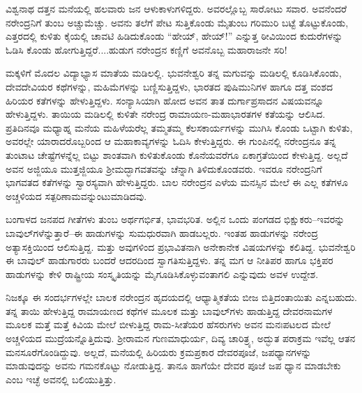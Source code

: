 ವಿಶ್ವನಾಥ ದತ್ತನ ಮನೆಯಲ್ಲಿ ಹಲವಾರು ಜನ ಆಳುಕಾಳುಗಳಿದ್ದರು. ಅವರಲ್ಲೊಬ್ಬ ಸಾರೋಟು ಸವಾರ. ಅವನೆಂದರೆ ನರೇಂದ್ರನಿಗೆ ತುಂಬ ಅಚ್ಚುಮೆಚ್ಚು. ಅವನು ತಲೆಗೆ ಪೇಟ ಸುತ್ತಿಕೊಂಡು ಮೈತುಂಬ ಗರಿಮುರಿ ಬಟ್ಟೆ ತೊಟ್ಟುಕೊಂಡು, ಎತ್ತರದಲ್ಲಿ ಕುಳಿತು ಕೈಯಲ್ಲಿ ಚಾವಟಿ ಹಿಡಿದುಕೊಂಡು “ಹೇಯ್, ಹೇಯ್!” ಎನ್ನುತ್ತ ಠೀವಿಯಿಂದ ಕುದುರೆಗಳನ್ನು ಓಡಿಸಿ ಕೊಂಡು ಹೋಗುತ್ತಿದ್ದರೆ....ಹುಡುಗ ನರೇಂದ್ರನ ಕಣ್ಣಿಗೆ ಅವನೊಬ್ಬ ಮಹಾರಾಜನೇ ಸರಿ!

ಮಕ್ಕಳಿಗೆ ಮೊದಲ ವಿದ್ಯಾಭ್ಯಾಸ ಮಾತೆಯ ಮಡಿಲಲ್ಲಿ. ಭುವನೇಶ್ವರಿ ತನ್ನ ಮಗುವನ್ನು ಮಡಿಲಲ್ಲಿ ಕೂಡಿಸಿಕೊಂಡು, ದೇವದೇವಿಯರ ಕಥೆಗಳನ್ನು, ಮಹಿಮೆಗಳನ್ನು ಬಣ್ಣಿಸುತ್ತಿದ್ದಳು, ಭಾರತದ ಪುಷಿಮುನಿಗಳ ಹಾಗೂ ದತ್ತ ವಂಶದ ಹಿರಿಯರ ಕತೆಗಳನ್ನು ಹೇಳುತ್ತಿದ್ದಳು. ಸಂನ್ಯಾಸಿಯಾಗಿ ಹೋದ ಅವನ ತಾತ ದುರ್ಗಾಪ್ರಸಾದನ ವಿಷಯವನ್ನೂ ಹೇಳುತ್ತಿದ್ದಳು. ತಾಯಿಯ ಮಡಿಲಲ್ಲಿ ಕುಳಿತೇ ನರೇಂದ್ರ ರಾಮಾಯಣ-ಮಹಾಭಾರತಗಳ ಕತೆಯನ್ನು ಆಲಿಸಿದ. ಪ್ರತಿದಿನವೂ ಮಧ್ಯಾಹ್ನ ಮನೆಯ ಮಹಿಳೆಯರೆಲ್ಲ ತಮ್ಮತಮ್ಮ ಕೆಲಸಕಾರ್ಯಗಳನ್ನು ಮುಗಿಸಿ ಕೊಂಡು ಒಟ್ಟಾಗಿ ಕುಳಿತು, ಅವರಲ್ಲೇ ಯಾರಾದರೊಬ್ಬರಿಂದ ಆ ಮಹಾಕಾವ್ಯಗಳನ್ನು ಓದಿಸಿ ಕೇಳುತ್ತಿದ್ದರು. ಈ ಗುಂಪಿನಲ್ಲಿ ನರೇಂದ್ರನೂ ತನ್ನ ತುಂಟಾಟ ಚೇಷ್ಟೆಗಳನ್ನೆಲ್ಲ ಬಿಟ್ಟು ಶಾಂತವಾಗಿ ಕುಳಿತುಕೊಂಡು ಕೊನೆಯವರೆಗೂ ಏಕಾಗ್ರತೆಯಿಂದ ಕೇಳುತ್ತಿದ್ದ. ಅಲ್ಲದೆ ಅವನ ಅಜ್ಜಿಯೂ ಮುತ್ತಜ್ಜಿಯೂ ಶ್ರೀಮದ್ಭಾಗವತವನ್ನು ಚೆನ್ನಾಗಿ ತಿಳಿದುಕೊಂಡವರು. ಇವರೂ ನರೇಂದ್ರನಿಗೆ ಭಾಗವತದ ಕತೆಗಳನ್ನು ಸ್ವಾರಸ್ಯವಾಗಿ ಹೇಳುತ್ತಿದ್ದರು. ಬಾಲ ನರೇಂದ್ರನ ಎಳೆಯ ಮನಸ್ಸಿನ ಮೇಲೆ ಈ ಎಲ್ಲ ಕತೆಗಳೂ ಅಚ್ಚಳಿಯದ ಸತ್ಪರಿಣಾಮವನ್ನುಂಟುಮಾಡಿದವು.

ಬಂಗಾಳದ ಜನಪದ ಗೀತೆಗಳು ತುಂಬ ಅರ್ಥಗರ್ಭಿತ, ಭಾವಭರಿತ. ಅಲ್ಲಿನ ಒಂದು ಪಂಗಡದ ಭಿಕ್ಷುಕರು–ಇವರನ್ನು ಬಾವುಲ್​ಗಳೆನ್ನುತ್ತಾರೆ–ಈ ಹಾಡುಗಳನ್ನು ಸುಮಧುರವಾಗಿ ಹಾಡಬಲ್ಲರು. ಇಂತಹ ಹಾಡುಗಳನ್ನು ನರೇಂದ್ರ ಅತ್ಯಾಸಕ್ತಿಯಿಂದ ಆಲಿಸುತ್ತಿದ್ದ. ಮತ್ತು ಅವುಗಳಿಂದ ಪ್ರಭಾವಿತನಾಗಿ ಅನೇಕಾನೇಕ ವಿಷಯಗಳನ್ನು ಕಲಿತಿದ್ದ. ಭುವನೇಶ್ವರಿ ಈ ಬಾವುಲ್ ಹಾಡುಗಾರರು ಬಂದರೆ ಆದರದಿಂದ ಸ್ವಾಗತಿಸುತ್ತಿದ್ದಳು. ತನ್ನ ಮಗ ಆ ನೀತಿಪರ ಹಾಗೂ ಭಕ್ತಿಪರ ಹಾಡುಗಳನ್ನು ಕೇಳಿ ರಾಷ್ಟ್ರೀಯ ಸಂಸ್ಕೃತಿಯನ್ನು ಮೈಗೂಡಿಸಿಕೊಳ್ಳುವಂತಾಗಲಿ ಎನ್ನುವುದು ಅವಳ ಉದ್ದೇಶ.

ನಿಜಕ್ಕೂ ಈ ಸಂದರ್ಭಗಳಲ್ಲೇ ಬಾಲಕ ನರೇಂದ್ರನ ಹೃದಯದಲ್ಲಿ ಆಧ್ಯಾತ್ಮಿಕತೆಯ ಬೀಜ ಬಿತ್ತಿದಂತಾಯಿತು ಎನ್ನಬಹುದು. ತನ್ನ ತಾಯಿ ಹೇಳುತ್ತಿದ್ದ ರಾಮಾಯಣದ ಕಥೆಗಳ ಮೂಲಕ ಮತ್ತು ಬಾವುಲ್​ಗಳು ಹಾಡುತ್ತಿದ್ದ ದೇವರನಾಮಗಳ ಮೂಲಕ ಮತ್ತೆ ಮತ್ತೆ ಕಿವಿಯ ಮೇಲೆ ಬೀಳುತ್ತಿದ್ದ ರಾಮ-ಸೀತೆಯರ ಹೆಸರುಗಳು ಅವನ ಮನಃಪಟಲದ ಮೇಲೆ ಅಚ್ಚಳಿಯದ ಮುದ್ರೆಯನ್ನೊತ್ತಿದುವು. ಶ್ರೀರಾಮನ ಗುಣಮಾಧುರ್ಯ, ದಿವ್ಯ ಚಾರಿತ್ರ್ಯ, ಅದ್ಭುತ ಪರಾಕ್ರಮ ಇವೆಲ್ಲ ಆತನ ಮನಸೂರೆಗೊಂಡಿದ್ದುವು. ಅಲ್ಲದೆ, ಮನೆಯಲ್ಲಿ ಹಿರಿಯರು ಕ್ರಮಪ್ರಕಾರ ದೇವರಪೂಜೆ, ಜಪಧ್ಯಾನಗಳನ್ನು ಮಾಡುವುದನ್ನು ಅವನು ಗಮನಕೊಟ್ಟು ನೋಡುತ್ತಿದ್ದ. ತಾನೂ ಹಾಗೆಯೇ ದೇವರ ಪೂಜೆ ಜಪ ಧ್ಯಾನ ಮಾಡಬೇಕು ಎಂಬ ಇಚ್ಛೆ ಅವನಲ್ಲಿ ಬಲಿಯುತ್ತಿತ್ತು.

